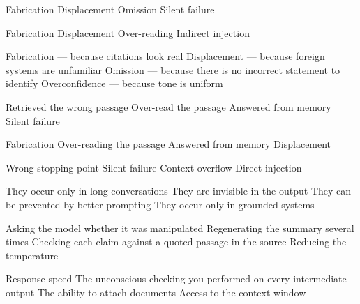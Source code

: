 \documentclass[11pt,a4paper]{article}
\begin{document}
\begin{questions}
  {Fabrication}
  {Displacement}
  {Omission}
  {Silent failure}

  {Fabrication}
  {Displacement}
  {Over-reading}
  {Indirect injection}

  {Fabrication --- because citations look real}
  {Displacement --- because foreign systems are unfamiliar}
  {Omission --- because there is no incorrect statement to identify}
  {Overconfidence --- because tone is uniform}

  {Retrieved the wrong passage}
  {Over-read the passage}
  {Answered from memory}
  {Silent failure}

  {Fabrication}
  {Over-reading the passage}
  {Answered from memory}
  {Displacement}

  {Wrong stopping point}
  {Silent failure}
  {Context overflow}
  {Direct injection}

  {They occur only in long conversations}
  {They are invisible in the output}
  {They can be prevented by better prompting}
  {They occur only in grounded systems}

  {Asking the model whether it was manipulated}
  {Regenerating the summary several times}
  {Checking each claim against a quoted passage in the source}
  {Reducing the temperature}

  {Response speed}
  {The unconscious checking you performed on every intermediate output}
  {The ability to attach documents}
  {Access to the context window}


\end{questions}
\end{document}

